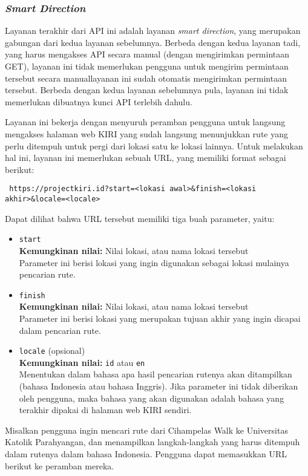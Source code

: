 \subsubsection{\textit{Smart Direction}}
\label{sec:kiri-api-smartdir}

Layanan terakhir dari API ini adalah layanan \textit{smart direction}, yang merupakan gabungan dari kedua layanan sebelumnya. Berbeda dengan kedua layanan tadi, yang harus mengakses API secara manual (dengan mengirimkan permintaan GET), layanan ini tidak memerlukan pengguna untuk mengirim permintaan tersebut secara manual\textemdash layanan ini sudah otomatis mengirimkan permintaan tersebut. Berbeda dengan kedua layanan sebelumnya pula, layanan ini tidak memerlukan dibuatnya kunci API terlebih dahulu.

Layanan ini bekerja dengan menyuruh peramban pengguna untuk langsung mengakses halaman web KIRI yang sudah langsung menunjukkan rute yang perlu ditempuh untuk pergi dari lokasi satu ke lokasi lainnya. Untuk melakukan hal ini, layanan ini memerlukan sebuah URL, yang memiliki format sebagai berikut:

\begin{verbatim}
 https://projectkiri.id?start=<lokasi awal>&finish=<lokasi akhir>&locale=<locale>
\end{verbatim}
\noindent
Dapat dilihat bahwa URL tersebut memiliki tiga buah parameter, yaitu:

\begin{itemize}
	\item \verb|start|\\
	\textbf{Kemungkinan nilai:} Nilai \latlon lokasi, atau nama lokasi tersebut\\
	Parameter ini berisi lokasi yang ingin digunakan sebagai lokasi mulainya pencarian rute.
	\item \verb|finish|\\
	\textbf{Kemungkinan nilai:} Nilai \latlon lokasi, atau nama lokasi tersebut\\
	Parameter ini berisi lokasi yang merupakan tujuan akhir yang ingin dicapai dalam pencarian rute.
	\item \verb|locale| (opsional)\\
	\textbf{Kemungkinan nilai:} \verb|id| atau \verb|en|\\
	Menentukan dalam bahasa apa hasil pencarian rutenya akan ditampilkan (bahasa Indonesia atau bahasa Inggris). Jika parameter ini tidak diberikan oleh pengguna, maka bahasa yang akan digunakan adalah bahasa yang terakhir dipakai di halaman web KIRI sendiri.
\end{itemize}
\vspace{\baselineskip}\noindent
Misalkan pengguna ingin mencari rute dari Cihampelas Walk ke Universitas Katolik Parahyangan, dan menampilkan langkah-langkah yang harus ditempuh dalam rutenya dalam bahasa Indonesia. Pengguna dapat memasukkan URL berikut ke peramban mereka.

